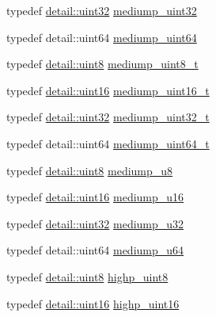 \begin{DoxyCompactItemize}
\item 
typedef \hyperlink{stb__image_8c_a1134b580f8da4de94ca6b1de4d37975e}{detail\+::uint32} \hyperlink{group__gtc__type__precision_ga861dbd1051f488e425b3966001b568e5}{mediump\+\_\+uint32}
\item 
typedef detail\+::uint64 \hyperlink{group__gtc__type__precision_ga6685788d15d0a973ee7c2460d0456dc1}{mediump\+\_\+uint64}
\item 
typedef \hyperlink{stb__image_8c_adde6aaee8457bee49c2a92621fe22b79}{detail\+::uint8} \hyperlink{group__gtc__type__precision_gadfa38f3c245d371c4b2079f1fd68928b}{mediump\+\_\+uint8\+\_\+t}
\item 
typedef \hyperlink{stb__image_8c_a05f6b0ae8f6a6e135b0e290c25fe0e4e}{detail\+::uint16} \hyperlink{group__gtc__type__precision_ga0b385466deac5ac96061ef2cdd6db20f}{mediump\+\_\+uint16\+\_\+t}
\item 
typedef \hyperlink{stb__image_8c_a1134b580f8da4de94ca6b1de4d37975e}{detail\+::uint32} \hyperlink{group__gtc__type__precision_gac7782c1e393f9ad47e41a177a685f287}{mediump\+\_\+uint32\+\_\+t}
\item 
typedef detail\+::uint64 \hyperlink{group__gtc__type__precision_gaa97354d3120a6dc029a5e9563723de18}{mediump\+\_\+uint64\+\_\+t}
\item 
typedef \hyperlink{stb__image_8c_adde6aaee8457bee49c2a92621fe22b79}{detail\+::uint8} \hyperlink{group__gtc__type__precision_gac04b372784392e82bd557f300c4de097}{mediump\+\_\+u8}
\item 
typedef \hyperlink{stb__image_8c_a05f6b0ae8f6a6e135b0e290c25fe0e4e}{detail\+::uint16} \hyperlink{group__gtc__type__precision_ga6745262ef6a6fdb8637b2387ef924828}{mediump\+\_\+u16}
\item 
typedef \hyperlink{stb__image_8c_a1134b580f8da4de94ca6b1de4d37975e}{detail\+::uint32} \hyperlink{group__gtc__type__precision_gad0c27a525045c299a92306eb4cd7c13a}{mediump\+\_\+u32}
\item 
typedef detail\+::uint64 \hyperlink{group__gtc__type__precision_ga00c51a16fa190b0a90205d50d6d8a44a}{mediump\+\_\+u64}
\item 
typedef \hyperlink{stb__image_8c_adde6aaee8457bee49c2a92621fe22b79}{detail\+::uint8} \hyperlink{group__gtc__type__precision_ga2c27c6dd26e893786f04b10f99c1ee95}{highp\+\_\+uint8}
\item 
typedef \hyperlink{stb__image_8c_a05f6b0ae8f6a6e135b0e290c25fe0e4e}{detail\+::uint16} \hyperlink{group__gtc__type__precision_ga4d32967d45ba8365e2a05eaaac85e978}{highp\+\_\+uint16}
\item 

\end{DoxyCompactItemize}
